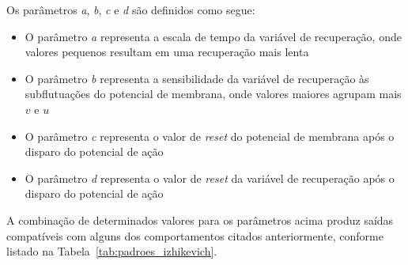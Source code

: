Os parâmetros \textit{a}, \textit{b}, \textit{c} e \textit{d} são definidos como segue:
\begin{itemize}
	\item O parâmetro \textit{a} representa a escala de tempo da variável de recuperação, onde valores pequenos resultam em uma recuperação mais lenta
	\item O parâmetro \textit{b} representa a sensibilidade da variável de recuperação às subflutuações do potencial de membrana, onde valores maiores agrupam mais $v$ e $u$
	\item O parâmetro \textit{c} representa o valor de \textit{reset} do potencial de membrana após o disparo do potencial de ação
	\item O parâmetro \textit{d} representa o valor de \textit{reset} da variável de recuperação após o disparo do potencial de ação
\end{itemize}
A combinação de determinados valores para os parâmetros acima produz saídas compatíveis com alguns dos comportamentos citados anteriormente, conforme listado na Tabela~\ref{tab:padroes_izhikevich}.
\begin{table}
\end{table}

